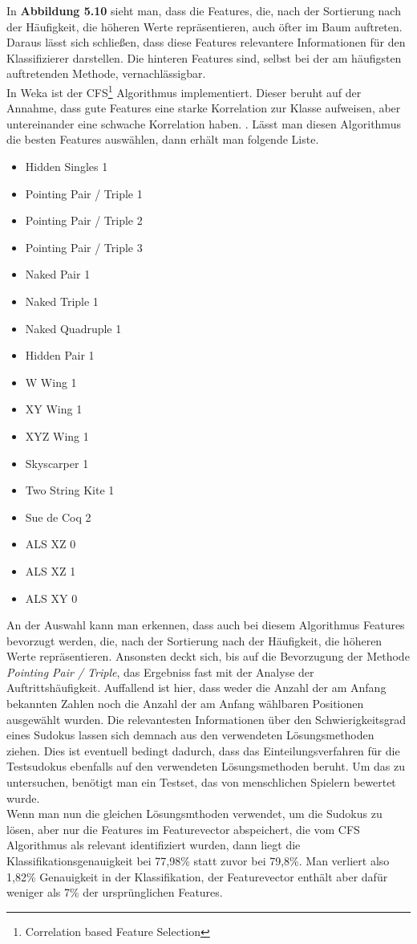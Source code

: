 \noindent In \textbf{Abbildung 5.10} sieht man, dass die Features, die, nach der Sortierung nach der Häufigkeit, die höheren Werte repräsentieren, auch öfter im Baum auftreten. Daraus lässt sich schließen, dass diese Features relevantere Informationen für den Klassifizierer darstellen. Die hinteren Features sind, selbst bei der am häufigsten auftretenden Methode, vernachlässigbar.\\
In Weka ist der CFS\footnote{Correlation based Feature Selection} Algorithmus implementiert. Dieser beruht auf der Annahme, dass gute Features eine starke Korrelation zur Klasse aufweisen, aber untereinander eine schwache Korrelation haben. \cite{Hall1998}. Lässt man diesen Algorithmus die besten Features auswählen, dann erhält man folgende Liste.
\begin{itemize}
\item Hidden Singles 1
\item Pointing Pair / Triple 1
\item Pointing Pair / Triple 2
\item Pointing Pair / Triple 3
\item Naked Pair 1
\item Naked Triple 1
\item Naked Quadruple 1
\item Hidden Pair 1
\item W Wing 1
\item XY Wing 1
\item XYZ Wing 1
\item Skyscarper 1
\item Two String Kite 1
\item Sue de Coq 2
\item ALS XZ 0
\item ALS XZ 1
\item ALS XY 0
\end{itemize}
An der Auswahl kann man erkennen, dass auch bei diesem Algorithmus Features bevorzugt werden, die, nach der Sortierung nach der Häufigkeit, die höheren Werte repräsentieren. Ansonsten deckt sich, bis auf die Bevorzugung der Methode \textit{Pointing Pair / Triple}, das Ergebniss fast mit der Analyse der Auftrittshäufigkeit. Auffallend ist hier, dass weder die Anzahl der am Anfang bekannten Zahlen noch die Anzahl der am Anfang wählbaren Positionen ausgewählt wurden. Die relevantesten Informationen über den Schwierigkeitsgrad eines Sudokus lassen sich demnach aus den verwendeten Lösungsmethoden ziehen. Dies ist eventuell bedingt dadurch, dass das Einteilungsverfahren für die Testsudokus ebenfalls auf den verwendeten Lösungsmethoden beruht. Um das zu untersuchen, benötigt man ein Testset, das von menschlichen Spielern bewertet wurde.\\
Wenn man nun die gleichen Lösungsmthoden verwendet, um die Sudokus zu lösen, aber nur die Features im Featurevector abspeichert, die vom CFS Algorithmus als relevant identifiziert wurden, dann liegt die Klassifikationsgenauigkeit bei 77,98\% statt zuvor bei 79,8\%. Man verliert also 1,82\% Genauigkeit in der Klassifikation, der Featurevector enthält aber dafür weniger als 7\% der ursprünglichen Features.